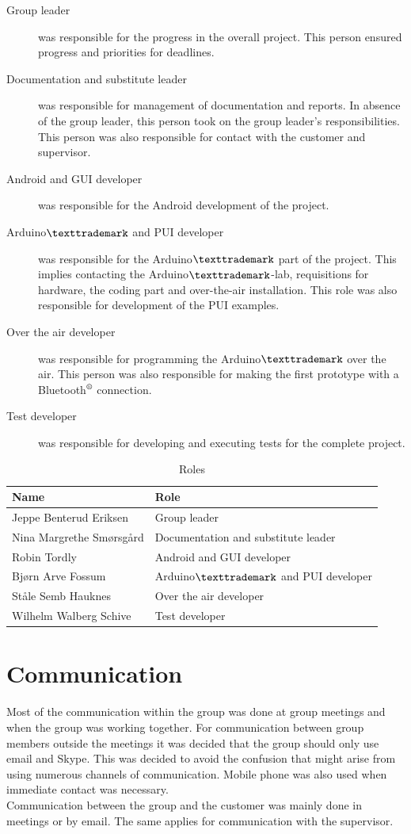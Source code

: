 \begin{description}
	\item[Group leader]{was responsible for the progress in the overall project. This person ensured progress and priorities for deadlines.}
	\item[Documentation and substitute leader]{was responsible for management of documentation and reports. In absence of the group leader, this person took on the group leader's responsibilities. This person was also responsible for contact with the customer and supervisor.}
	\item[Android and GUI developer]{was responsible for the Android development of the project.}
	\item[Arduino$\texttrademark$ and PUI developer]{was responsible for the Arduino$\texttrademark$ part of the project. This implies contacting the Arduino$\texttrademark$-lab, requisitions for hardware, the coding part and over-the-air installation. This role was also responsible for development of the PUI examples.}
	\item[Over the air developer]{was responsible for programming the Arduino$\texttrademark$ over the air. This person was also responsible for making the first prototype with a Bluetooth$\textsuperscript{\textregistered}$  connection.}
	\item[Test developer]{was responsible for developing and executing tests for the complete project.}
\end{description}

\begin{table}
\caption{Roles}
\begin{tabular}{|l|l|}
\hline
	{\bf Name} & {\bf Role}\\
\hline
	Jeppe Benterud Eriksen & Group leader\\
\hline
	Nina Margrethe Smørsgård & Documentation and substitute leader\\
\hline
	Robin Tordly & Android and GUI developer\\
\hline
	Bjørn Arve Fossum & Arduino$\texttrademark$ and PUI developer\\
\hline
	Ståle Semb Hauknes & Over the air developer\\
\hline
	Wilhelm Walberg Schive & Test developer\\
\hline
\end{tabular}
\end{table}

\section{Communication}
Most of the communication within the group was done at group meetings and when the group was working together. For communication between group members outside the meetings it was decided that the group should only use email and Skype. This was decided to avoid the confusion that might arise from using numerous channels of communication. Mobile phone was also used when immediate contact was necessary.\\
\newline
Communication between the group and the customer was mainly done in meetings or by email. The same applies for communication with the supervisor.

